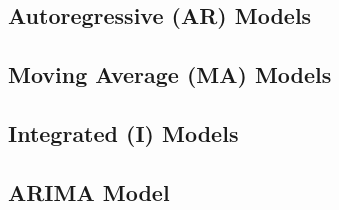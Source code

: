 \subsection{Autoregressive (AR) Models}
\label{additional:time_series:AR}

\subsection{Moving Average (MA) Models}
\label{additional:time_series:MA}

\subsection{Integrated (I) Models}
\label{additional:time_series:I}

\subsection{ARIMA Model}
\label{additional:time_series:ARIMA}
